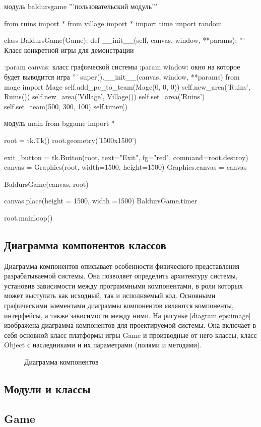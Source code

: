 модуль baldursgame '''пользовательский модуль'''

from ruins import *
from village import *
import time
import random

class BaldursGame(Game):
def \_\_init\_\_(self, canvas, window, **params):
'''
Класс конкретной игры для демонстрации

:param canvas: класс графической системы
:param window: окно на которое будет выводится игра
'''
super().\_\_init\_\_(canvas, window, **params)
from mage import Mage
self.add\_pc\_to\_team(Mage(0, 0, 0))
self.new\_area('Ruins', Ruins())
self.new\_area('Village', Village())
self.set\_area('Ruins')
self.set\_team(500, 300, 100)
self.timer()

модуль main
from bggame import *

root = tk.Tk()
root.geometry('1500x1500')

exit\_button = tk.Button(root, text="Exit", fg="red", command=root.destroy)
canvas = Graphics(root, width=1500, height=1500)
Graphics.canvas = canvas

BaldursGame(canvas, root)

canvas.place(height = 1500, width =1500)
BaldursGame.timer

root.mainloop()

\subsection{Диаграмма компонентов классов}

Диаграмма компонентов описывает особенности физического представления разрабатываемой системы. Она позволяет определить архитектуру системы, установив зависимости между программными компонентами, в роли которых может выступать как исходный, так и исполняемый код. Основными графическими элементами диаграммы компонентов являются компоненты, интерфейсы, а также зависимости между ними. На рисунке \ref{diagram.eps:image} изображена диаграмма компонентов для проектируемой системы. Она включает в себя основной класс платформы игры Game и производные от него классы, класс Object с наследниками и их параметрами (полями и методами).
\begin{figure}[ht]
	\caption{Диаграмма компонентов}
	\label{diagram:image}
\end{figure}
\subsection{Модули и классы}
\subsection{Game}
